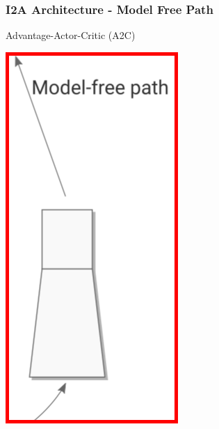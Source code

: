 \begin{frame}
    \frametitle{I2A Architecture - Model Free Path}

\begin{multicols}{2}
	\begin{PraesentationAufzaehlung}
		\item Advantage-Actor-Critic (A2C)
	\end{PraesentationAufzaehlung}
    \vfill\columnbreak
	\begin{center}
    \includegraphics[height=.5\textheight]{./Images/i2a_model_free_path.png}%
	\end{center}
\end{multicols}
    
\end{frame}
\clearpage


